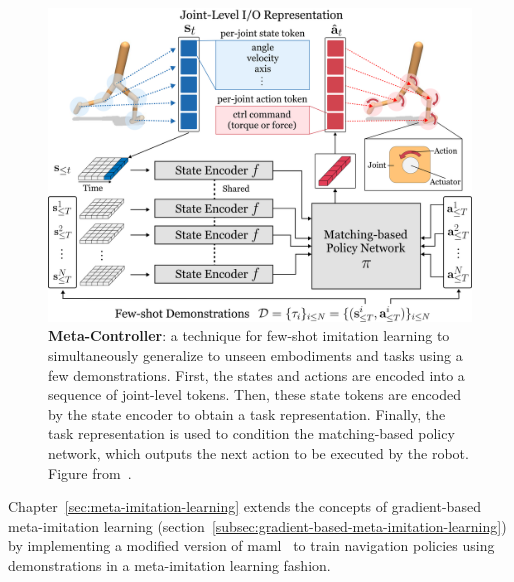 \begin{figure}
    \centering
    \includegraphics[width=\textwidth]{figures/related_work/transformer_mil}
    \caption{\textbf{Meta-Controller}: a technique for few-shot imitation learning to simultaneously generalize to unseen embodiments and tasks using a few demonstrations.
    First, the states and actions are encoded into a sequence of joint-level tokens.
    Then, these state tokens are encoded by the state encoder to obtain a task representation.
    Finally, the task representation is used to condition the matching-based policy network, which outputs the next action to be executed by the robot.
    Figure from~\cite{cho2024metacontroller}.}
    \label{fig:transformer-mil}
\end{figure}

Chapter~\ref{sec:meta-imitation-learning} extends the concepts of gradient-based meta-imitation learning (section~\ref{subsec:gradient-based-meta-imitation-learning}) by implementing a modified version of \acrshort{maml}~\cite{finn2017} to train navigation policies using demonstrations in a meta-imitation learning fashion.

